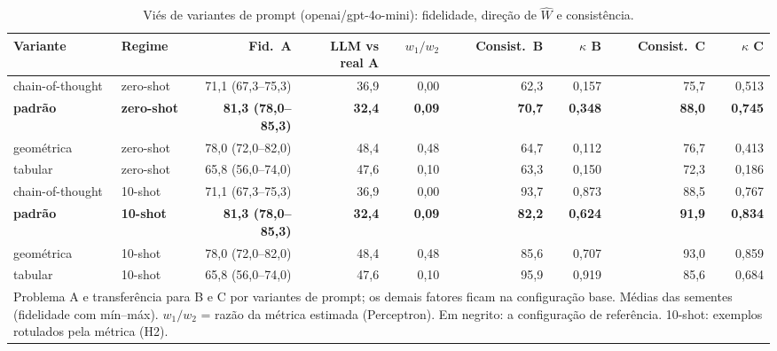 \begin{table}[htbp]
\centering
\small
\caption{Viés de variantes de prompt (openai/gpt-4o-mini): fidelidade, direção de $\hat{W}$ e consistência.}
\label{tab:bloco1_vies_variantes_prompt_gpt4mini}
\begin{tabular}{llrrrrrrr}
\toprule
Variante & Regime & Fid.\ A & LLM vs real A & $w_1/w_2$ & Consist.\ B & $\kappa$ B & Consist.\ C & $\kappa$ C \\
\midrule
chain-of-thought & zero-shot & 71,1 (67,3–75,3) & 36,9 & 0,00 & 62,3 & 0,157 & 75,7 & 0,513 \\
\textbf{padrão} & \textbf{zero-shot} & \textbf{81,3 (78,0–85,3)} & \textbf{32,4} & \textbf{0,09} & \textbf{70,7} & \textbf{0,348} & \textbf{88,0} & \textbf{0,745} \\
geométrica & zero-shot & 78,0 (72,0–82,0) & 48,4 & 0,48 & 64,7 & 0,112 & 76,7 & 0,413 \\
tabular & zero-shot & 65,8 (56,0–74,0) & 47,6 & 0,10 & 63,3 & 0,150 & 72,3 & 0,186 \\
\midrule
chain-of-thought & 10-shot & 71,1 (67,3–75,3) & 36,9 & 0,00 & 93,7 & 0,873 & 88,5 & 0,767 \\
\textbf{padrão} & \textbf{10-shot} & \textbf{81,3 (78,0–85,3)} & \textbf{32,4} & \textbf{0,09} & \textbf{82,2} & \textbf{0,624} & \textbf{91,9} & \textbf{0,834} \\
geométrica & 10-shot & 78,0 (72,0–82,0) & 48,4 & 0,48 & 85,6 & 0,707 & 93,0 & 0,859 \\
tabular & 10-shot & 65,8 (56,0–74,0) & 47,6 & 0,10 & 95,9 & 0,919 & 85,6 & 0,684 \\
\bottomrule
\multicolumn{9}{p{0.95\linewidth}}{\footnotesize Problema A e transferência para B e C por variantes de prompt; os demais fatores ficam na configuração base. Médias das sementes (fidelidade com mín–máx). $w_1/w_2$ = razão da métrica estimada (Perceptron). Em negrito: a configuração de referência. 10-shot: exemplos rotulados pela métrica (H2).} \\
\end{tabular}
\end{table}

